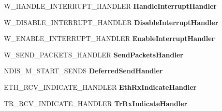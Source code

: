 \begin{DoxyCompactItemize}
\mbox{\label{struct___n_d_i_s___m_i_n_i_p_o_r_t___b_l_o_c_k_adf0ffda7b6fc1d7de9fc1d47537a95ab}} 
W\+\_\+\+H\+A\+N\+D\+L\+E\+\_\+\+I\+N\+T\+E\+R\+R\+U\+P\+T\+\_\+\+H\+A\+N\+D\+L\+ER {\bfseries Handle\+Interrupt\+Handler}
\item 
\mbox{\label{struct___n_d_i_s___m_i_n_i_p_o_r_t___b_l_o_c_k_a9a35ceecae8e0e6c45815f51482b417d}} 
W\+\_\+\+D\+I\+S\+A\+B\+L\+E\+\_\+\+I\+N\+T\+E\+R\+R\+U\+P\+T\+\_\+\+H\+A\+N\+D\+L\+ER {\bfseries Disable\+Interrupt\+Handler}
\item 
\mbox{\label{struct___n_d_i_s___m_i_n_i_p_o_r_t___b_l_o_c_k_af08f8718a938a90585eef906836e9c56}} 
W\+\_\+\+E\+N\+A\+B\+L\+E\+\_\+\+I\+N\+T\+E\+R\+R\+U\+P\+T\+\_\+\+H\+A\+N\+D\+L\+ER {\bfseries Enable\+Interrupt\+Handler}
\item 
\mbox{\label{struct___n_d_i_s___m_i_n_i_p_o_r_t___b_l_o_c_k_a784eda3b6236e416fbd1851247b8b442}} 
W\+\_\+\+S\+E\+N\+D\+\_\+\+P\+A\+C\+K\+E\+T\+S\+\_\+\+H\+A\+N\+D\+L\+ER {\bfseries Send\+Packets\+Handler}
\item 
\mbox{\label{struct___n_d_i_s___m_i_n_i_p_o_r_t___b_l_o_c_k_a9f0d647489611767d72760802bf09a97}} 
N\+D\+I\+S\+\_\+\+M\+\_\+\+S\+T\+A\+R\+T\+\_\+\+S\+E\+N\+DS {\bfseries Deferred\+Send\+Handler}
\item 
\mbox{\label{struct___n_d_i_s___m_i_n_i_p_o_r_t___b_l_o_c_k_a50df37345b7061ece215d1ccefc40b42}} 
E\+T\+H\+\_\+\+R\+C\+V\+\_\+\+I\+N\+D\+I\+C\+A\+T\+E\+\_\+\+H\+A\+N\+D\+L\+ER {\bfseries Eth\+Rx\+Indicate\+Handler}
\item 
\mbox{\label{struct___n_d_i_s___m_i_n_i_p_o_r_t___b_l_o_c_k_ad61b25f5b264cdcb396dc1773e291db7}} 
T\+R\+\_\+\+R\+C\+V\+\_\+\+I\+N\+D\+I\+C\+A\+T\+E\+\_\+\+H\+A\+N\+D\+L\+ER {\bfseries Tr\+Rx\+Indicate\+Handler}
\item 
\mbox{\label{struct___n_d_i_s___m_i_n_i_p_o_r_t___b_l_o_c_k_a63085db3443ec39efb22e25983493fe7}} 

\end{DoxyCompactItemize}
